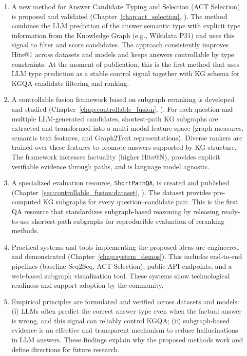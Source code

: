 \begin{enumerate}
    \item A new method for Answer Candidate Typing and Selection (ACT Selection) is proposed and validated (Chapter~\ref{chap:act_selection}, \cite{DBLP:journals/corr/abs-2310-07008}). The method combines the LLM prediction of the answer semantic type with explicit type information from the Knowledge Graph (e.g., Wikidata P31) and uses this signal to filter and score candidates. The approach consistently improves Hits@1 across datasets and models and keeps answers controllable by type constraints. At the moment of publication, this is the first method that uses LLM type prediction as a stable control signal together with KG schema for KGQA candidate filtering and ranking.
    \item A controllable fusion framework based on subgraph reranking is developed and studied (Chapter~\ref{chap:controllable_fusion}, \cite{DBLP:journals/corr/abs-2310-02166}). For each question and multiple LLM-generated candidates, shortest-path KG subgraphs are extracted and transformed into a multi-modal feature space (graph measures, semantic text features, and Graph2Text representations). Diverse rankers are trained over these features to promote answers supported by KG structure. The framework increases factuality (higher Hits@N), provides explicit verifiable evidence through paths, and is language model agnostic.
    \item A specialized evaluation resource, \texttt{ShortPathQA}, is created and published (Chapter~\ref{sec:controllable_fusion:dataset}, \cite{DBLP:conf/nldb/SalnikovSPQA25}). The dataset provides pre-computed KG subgraphs for every question–candidate pair. This is the first QA resource that standardizes subgraph-based reasoning by releasing ready-to-use shortest-path subgraphs for reproducible evaluation of reranking methods.
    \item Practical systems and tools implementing the proposed ideas are engineered and demonstrated (Chapter~\ref{chap:system_demos}). This includes end-to-end pipelines (baseline Seq2Seq, ACT Selection), public API endpoints, and a web-based subgraph visualization tool. These systems show technological readiness and support adoption by the community.
    \item Empirical principles are formulated and verified across datasets and models: (i) LLMs often predict the correct answer type even when the factual answer is wrong, and this signal can reliably control KGQA; (ii) subgraph-based evidence is an effective and transparent mechanism to reduce hallucinations in LLM answers. These findings explain why the proposed methods work and define directions for future research.
\end{enumerate}


